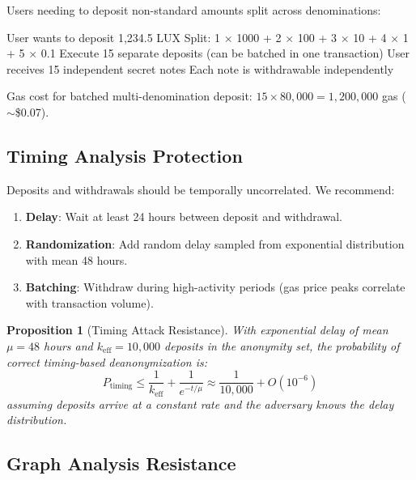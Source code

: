 \documentclass[11pt,a4paper]{article}
\newtheorem{proposition}[theorem]{Proposition}
\begin{document}
Users needing to deposit non-standard amounts split across denominations:

\begin{algorithm}[H]
\caption{Multi-Denomination Deposit}
\label{alg:multidenom}
\begin{algorithmic}[1]
\Require User wants to deposit 1,234.5 LUX
\State Split: 1 $\times$ 1000 + 2 $\times$ 100 + 3 $\times$ 10 + 4 $\times$ 1 + 5 $\times$ 0.1
\State Execute 15 separate deposits (can be batched in one transaction)
\State User receives 15 independent secret notes
\State Each note is withdrawable independently
\end{algorithmic}
\end{algorithm}

Gas cost for batched multi-denomination deposit: $15 \times 80{,}000 = 1{,}200{,}000$ gas ($\sim$\$0.07).

\subsection{Timing Analysis Protection}

Deposits and withdrawals should be temporally uncorrelated. We recommend:

\begin{enumerate}
    \item \textbf{Delay}: Wait at least 24 hours between deposit and withdrawal.
    \item \textbf{Randomization}: Add random delay sampled from exponential distribution with mean 48 hours.
    \item \textbf{Batching}: Withdraw during high-activity periods (gas price peaks correlate with transaction volume).
\end{enumerate}

\begin{proposition}[Timing Attack Resistance]
With exponential delay of mean $\mu = 48$ hours and $k_{\text{eff}} = 10{,}000$ deposits in the anonymity set, the probability of correct timing-based deanonymization is:
\begin{equation}
    P_{\text{timing}} \leq \frac{1}{k_{\text{eff}}} + \frac{1}{e^{-t/\mu}} \approx \frac{1}{10{,}000} + O(10^{-6})
\end{equation}
assuming deposits arrive at a constant rate and the adversary knows the delay distribution.
\end{proposition}

\subsection{Graph Analysis Resistance}
\end{document}
